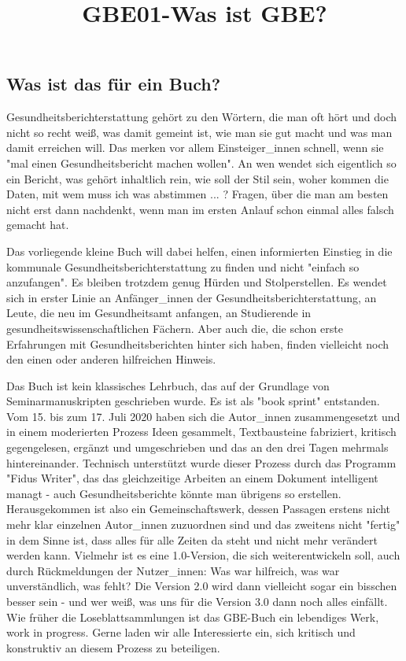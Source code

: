 \documentclass{article}
\begin{document}
\title{GBE01-Was ist GBE? }

\maketitle





\subsection{Was ist das für ein Buch?}\label{H2662218}



Gesundheitsberichterstattung gehört zu den Wörtern, die man oft hört und doch nicht so recht weiß, was damit gemeint ist, wie man sie gut macht und was man damit erreichen will. Das merken vor allem Einsteiger\_innen schnell, wenn sie "mal einen Gesundheitsbericht machen wollen". An wen wendet sich eigentlich so ein Bericht, was gehört inhaltlich rein, wie soll der Stil sein, woher kommen die Daten, mit wem muss ich was abstimmen ... ? Fragen, über die man am besten nicht erst dann nachdenkt, wenn man im ersten Anlauf schon einmal alles falsch gemacht hat.


Das vorliegende kleine Buch will dabei helfen, einen informierten Einstieg in die kommunale Gesundheitsberichterstattung zu finden und nicht "einfach so anzufangen". Es bleiben trotzdem genug Hürden und Stolperstellen. Es wendet sich in erster Linie an Anfänger\_innen der Gesundheitsberichterstattung, an Leute, die neu im Gesundheitsamt anfangen, an Studierende in gesundheitswissenschaftlichen Fächern. Aber auch die, die schon erste Erfahrungen mit Gesundheitsberichten hinter sich haben, finden vielleicht noch den einen oder anderen hilfreichen Hinweis.


Das Buch ist kein klassisches Lehrbuch, das auf der Grundlage von Seminarmanuskripten geschrieben wurde. Es ist als "book sprint" entstanden. Vom 15. bis zum 17. Juli 2020 haben sich die Autor\_innen zusammengesetzt und in einem moderierten Prozess Ideen gesammelt, Textbausteine fabriziert, kritisch gegengelesen, ergänzt und umgeschrieben und das an den drei Tagen mehrmals hintereinander. Technisch unterstützt wurde dieser Prozess durch das Programm "Fidus Writer", das das gleichzeitige Arbeiten an einem Dokument intelligent managt - auch Gesundheitsberichte könnte man übrigens so erstellen. Herausgekommen ist also ein Gemeinschaftswerk, dessen Passagen erstens nicht mehr klar einzelnen Autor\_innen zuzuordnen sind und das zweitens nicht "fertig" in dem Sinne ist, dass alles für alle Zeiten da steht und nicht mehr verändert werden kann. Vielmehr ist es eine 1.0-Version, die sich weiterentwickeln soll, auch durch Rückmeldungen der Nutzer\_innen: Was war hilfreich, was war unverständlich, was fehlt? Die Version 2.0 wird dann vielleicht sogar ein bisschen besser sein - und wer weiß, was uns für die Version 3.0 dann noch alles einfällt. Wie früher die Loseblattsammlungen ist das GBE-Buch ein lebendiges Werk, work in progress. Gerne laden wir alle Interessierte ein, sich kritisch und konstruktiv an diesem Prozess zu beteiligen.
\end{document}
